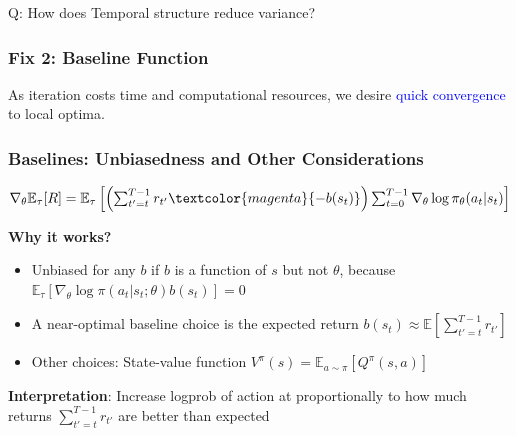 \documentclass{article}
\begin{document}
\begin{hintbox}
    Q: How does Temporal structure reduce variance?
\end{hintbox}

\subsubsection{Fix 2: Baseline Function}
As iteration costs time and computational resources, we desire \textcolor{blue}{quick convergence} to local optima.

\begin{thmbox}
    \subsubsection*{Baselines: Unbiasedness and Other Considerations}
    $\nabla_{\theta} \mathbb{E}_{\tau} [R] = \mathbb{E}_{\tau} \left[ \left(\sum_{t' = t}^{T-1} r_{t'} \textcolor{magenta}{- b(s_t)} \right) \sum_{t=0}^{T-1} \nabla_{\theta} \log \pi_{\theta} (a_t | s_t) \right]$

    \textbf{Why it works?}
    \begin{itemize}
    \item Unbiased for any $b$ if $b$ is a function of $s$ but not $\theta$, because
        \\$\mathbb{E}_{\tau} \left[ \nabla_{\theta} \log \pi(a_t | s_t; \theta) b(s_t) \right] = 0$
    \item A near-optimal baseline choice is the expected return 
        $b(s_t) \approx \mathbb{E} \left[ \sum_{t' = t}^{T-1} r_{t'} \right]$
    \item Other choices: State-value function $V^{\pi}(s) = \mathbb{E}_{a \sim \pi} \left[ Q^{\pi} (s, a) \right]$
    \end{itemize}
    \textbf{Interpretation}: Increase logprob of action at proportionally to how much returns 
    $\sum^{T-1}_{t'= t} r_{t'}$ are better than expected
\end{thmbox}
\end{document}
